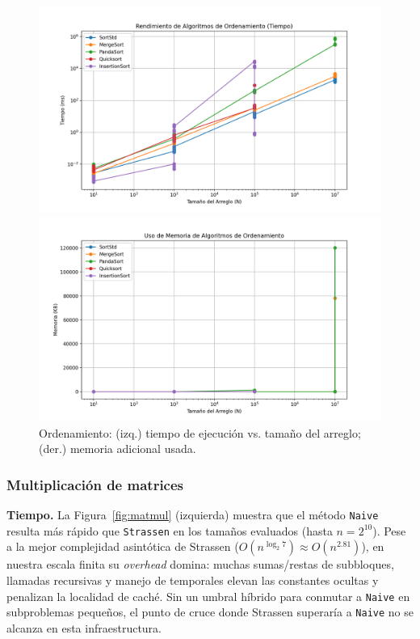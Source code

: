 \begin{figure}[H]
    \centering
    \begin{minipage}[t]{0.49\textwidth}
        \includegraphics[width=\textwidth]{../code/sorting/data/plots/tiempo.png}
    \end{minipage}\hfill
    \begin{minipage}[t]{0.49\textwidth}
        \includegraphics[width=\textwidth]{../code/sorting/data/plots/memoria.png}
    \end{minipage}
    \caption{Ordenamiento: (izq.) tiempo de ejecución vs. tamaño del arreglo; (der.) memoria adicional usada.}
    \label{fig:sorting}
\end{figure}

\subsubsection*{Multiplicación de matrices}

\textbf{Tiempo.} La Figura~\ref{fig:matmul} (izquierda) muestra que el método \texttt{Naive} resulta más rápido que \texttt{Strassen} en los tamaños evaluados (hasta $n=2^{10}$). Pese a la mejor complejidad asintótica de Strassen ($O(n^{\log_2 7}) \approx O(n^{2.81})$), en nuestra escala finita su \emph{overhead} domina: muchas sumas/restas de subbloques, llamadas recursivas y manejo de temporales elevan las constantes ocultas y penalizan la localidad de caché. Sin un umbral híbrido para conmutar a \texttt{Naive} en subproblemas pequeños, el punto de cruce donde Strassen superaría a \texttt{Naive} no se alcanza en esta infraestructura.

